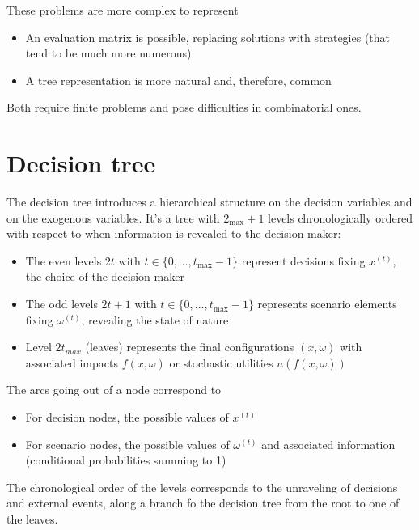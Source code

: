 These problems are more complex to represent
\begin{itemize}
	\item An evaluation matrix is possible, replacing solutions with strategies (that tend to be much more numerous)
	
	\item A tree representation is more natural and, therefore, common
\end{itemize}
Both require finite problems and pose difficulties in combinatorial ones.

\section{Decision tree}
\label{sec:dectree}

The decision tree introduces a hierarchical structure on the decision variables and on the exogenous variables. It's a tree with $2_{\max} + 1$ levels chronologically ordered with respect to when information is revealed to the decision-maker: 
\begin{itemize}
	\item The even levels $2t$ with $t \in \{0, \dots, t_{\max} -  1\}$ represent decisions fixing $x^{(t)}$, the choice of the decision-maker
	
	\item The odd levels $2t+1$ with $t \in \{0, \dots, t_{\max} - 1\}$ represents scenario elements fixing $\omega^{(t)}$, revealing the state of nature
	
	\item Level $2t_{max}$ (leaves) represents the final configurations $(x, \omega)$ with associated impacts $f(x, \omega)$ or stochastic utilities $u(f(x, \omega))$
\end{itemize}

The arcs going out of a node correspond to
\begin{itemize}
	\item For decision nodes, the possible values of $x^{(t)}$
	
	\item For scenario nodes, the possible values of $\omega^{(t)}$ and associated information (conditional probabilities summing to 1)
\end{itemize}

The chronological order of the levels corresponds to the unraveling of decisions and external events, along a branch fo the decision tree from the root to one of the leaves. 

